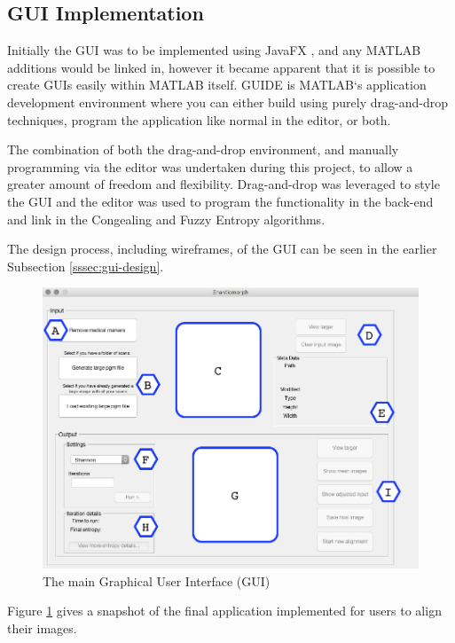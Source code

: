 \subsection{GUI Implementation}
\label{ssec:GUI-implement}

Initially the \acrfull{GUI} was to be implemented using JavaFX \cite{javafx}, and any MATLAB additions would be linked in, however it became apparent that it is possible to create \acrshort{GUI}s easily within MATLAB itself. GUIDE \cite{guide} is MATLAB`s application development environment where you can either build using purely drag-and-drop techniques, program the application like normal in the editor, or both.

The combination of both the drag-and-drop environment, and manually programming via the editor was undertaken during this project, to allow a greater amount of freedom and flexibility. Drag-and-drop was leveraged to style the \acrshort{GUI} and the editor was used to program the functionality in the back-end and link in the \Gls{Congealing} and Fuzzy Entropy algorithms.

The design process, including wireframes, of the \acrshort{GUI} can be seen in the earlier Subsection \ref{sssec:gui-design}.

\begin{figure}[H]
  \center
  \includegraphics[scale=0.45]{Chapter2/software-img/final_gui.png}
  \caption{The main Graphical User Interface (GUI)}
  \label{fig:final_gui_pic}
\end{figure}

Figure \ref{fig:final_gui_pic} gives a snapshot of the final application implemented for users to align their images.

